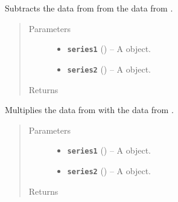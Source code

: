 \documentclass[letterpaper,10pt,english]{sphinxmanual}
\begin{document}

\begin{fulllineitems}
\label{additional_functions:fredpy.minus}
Subtracts the data from  from the data from .
\begin{quote}\begin{description}
\item[{Parameters}] \leavevmode\begin{itemize}
\item {} 
\textbf{\texttt{series1}} ({\hyperref[series_class:fredpy.series]{}}) -- A  object.

\item {} 
\textbf{\texttt{series2}} ({\hyperref[series_class:fredpy.series]{}}) -- A  object.

\end{itemize}

\item[{Returns}] \leavevmode
{\hyperref[series_class:fredpy.series]{}}

\end{description}\end{quote}

\end{fulllineitems}


\begin{fulllineitems}
\label{additional_functions:fredpy.times}
Multiplies the data from  with the data from .
\begin{quote}\begin{description}
\item[{Parameters}] \leavevmode\begin{itemize}
\item {} 
\textbf{\texttt{series1}} ({\hyperref[series_class:fredpy.series]{}}) -- A  object.

\item {} 
\textbf{\texttt{series2}} ({\hyperref[series_class:fredpy.series]{}}) -- A  object.

\end{itemize}

\item[{Returns}] \leavevmode
{\hyperref[series_class:fredpy.series]{}}

\end{description}\end{quote}

\end{fulllineitems}
\end{document}
